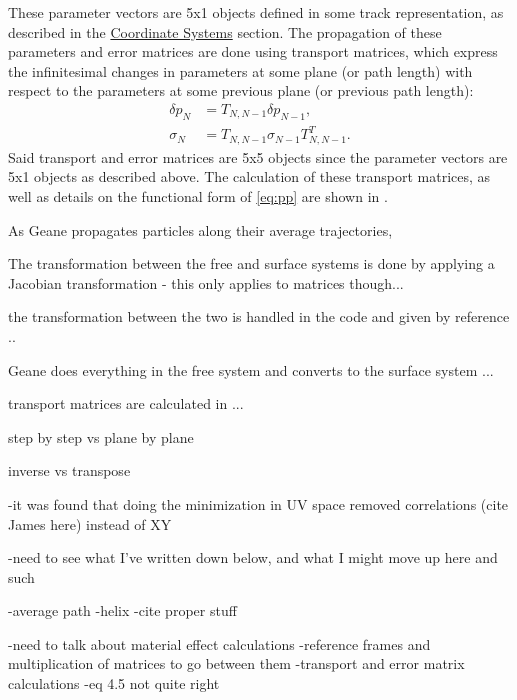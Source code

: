 \clearpage



These parameter vectors are 5x1 objects defined in some track representation, as described in the \hyperref[sec:Coord]{Coordinate Systems} section. The propagation of these parameters and error matrices are done using transport matrices, which express the infinitesimal changes in parameters at some plane (or path length) with respect to the parameters at some previous plane (or previous path length):
    \begin{align} \label{eq:transport}
        \delta p_{N} &= T_{N,N-1} \delta p_{N-1}, \\
        \sigma_{N} &= T_{N,N-1} \sigma_{N-1} T_{N,N-1}^{T}.
    \end{align}
Said transport and error matrices are 5x5 objects since the parameter vectors are 5x1 objects as described above. The calculation of these transport matrices, as well as details on the functional form of \ref{eq:pp} are shown in \cite{jacob}.






As Geane propagates particles along their average trajectories, 





The transformation between the free and surface systems is done by applying a Jacobian transformation - this only applies to matrices though...


the transformation between the two is handled in the code and given by reference .. 


Geane does everything in the free system and converts to the surface system ... 

transport matrices are calculated in ...


step by step vs plane by plane

inverse vs transpose


-it was found that doing the minimization in UV space removed correlations (cite James here) instead of XY








-need to see what I've written down below, and what I might move up here and such

-average path
-helix
-cite proper stuff

-need to talk about material effect calculations
-reference frames and multiplication of matrices to go between them
-transport and error matrix calculations
-eq 4.5 not quite right


